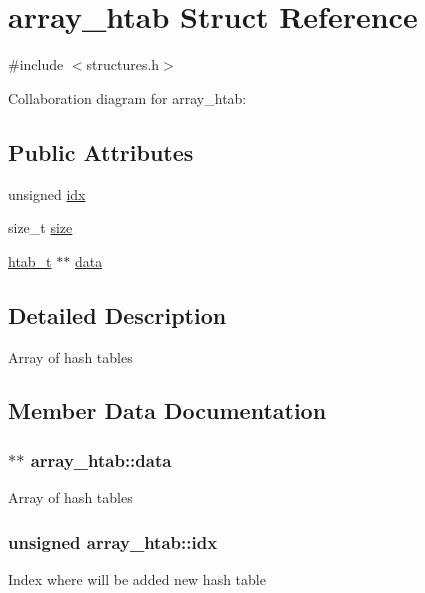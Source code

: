 \hypertarget{structarray__htab}{}\section{array\+\_\+htab Struct Reference}
\label{structarray__htab}


{\ttfamily \#include $<$structures.\+h$>$}



Collaboration diagram for array\+\_\+htab\+:
\subsection*{Public Attributes}
\begin{DoxyCompactItemize}
\item 
unsigned \hyperlink{structarray__htab_afd9eaf3820cafa19b1605f4779707121}{idx}
\item 
size\+\_\+t \hyperlink{structarray__htab_a63abd88a74d355292833e33b5a6b1a72}{size}
\item 
\hyperlink{structhtab__t}{htab\+\_\+t} $\ast$$\ast$ \hyperlink{structarray__htab_a001618dfa51bc6f8099502658c152a1a}{data}
\end{DoxyCompactItemize}


\subsection{Detailed Description}
Array of hash tables 

\subsection{Member Data Documentation}
\subsubsection[{\texorpdfstring{data}{data}}]{$\ast$$\ast$ array\+\_\+htab\+::data}\hypertarget{structarray__htab_a001618dfa51bc6f8099502658c152a1a}{}\label{structarray__htab_a001618dfa51bc6f8099502658c152a1a}
Array of hash tables 
\subsubsection[{\texorpdfstring{idx}{idx}}]{\setlength{\rightskip}{0pt plus 5cm}unsigned array\+\_\+htab\+::idx}\hypertarget{structarray__htab_afd9eaf3820cafa19b1605f4779707121}{}\label{structarray__htab_afd9eaf3820cafa19b1605f4779707121}
Index where will be added new hash table 
